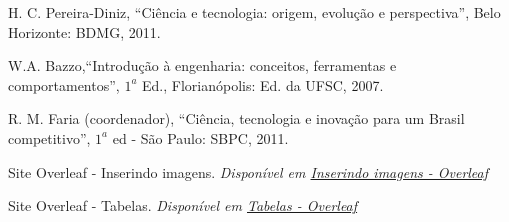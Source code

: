 \documentclass[conference]{ModeloA}
\begin{document}
\begin{thebibliography}{00}
	
 H. C. Pereira-Diniz, ``Ciência e tecnologia: origem, evolução e perspectiva'', Belo Horizonte: BDMG, 2011.

 W.A. Bazzo,``Introdução à engenharia: conceitos, ferramentas e comportamentos'', $1^a$ Ed., Florianópolis: Ed. da UFSC, 2007.

 R. M. Faria (coordenador),  ``Ciência, tecnologia e inovação para um Brasil competitivo'', $1^a$ ed - São Paulo: SBPC, 2011.

 Site Overleaf - Inserindo imagens. {\it Disponível em \href{https://pt.overleaf.com/learn/latex/Inserting_Images}{Inserindo imagens - Overleaf}}

 Site Overleaf - Tabelas. {\it Disponível em \href{https://pt.overleaf.com/learn/latex/Tables}{Tabelas - Overleaf}}

\end{thebibliography}
\end{document}
